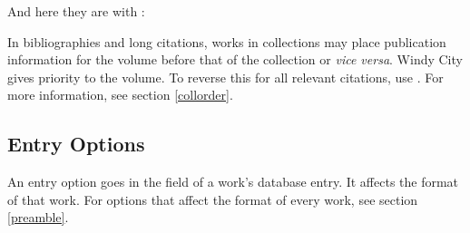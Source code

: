 \documentclass[11pt,letterpaper,oneside]{article}
\begin{document}
\begin{optionlist}
\hypersetup{citecolor=blue}
\begin{citeonly}
\item \cite[24--25]{morley1995}
\item \cite{schwartz1992}
\item \cite{kaiser1964}
\item \cite[43]{morley1995}
\item \cite[138]{schwartz1992}
\item \cite[189--90]{kaiser1964}
\end{citeonly}

\noindent And here they are with :

\begin{citeonly}
\item \cite[24--25]{morley1995}
\item \cite{schwartz1992}
\item \cite{kaiser1964}
\item \cite[43]{morley1995}
\item \cite[138]{schwartz1992}
\item \cite[189--90]{kaiser1964}
\end{citeonly}
\hypersetup{citecolor=}


\noindent In bibliographies and long citations, works in collections
may place publication information for the volume before that of the
collection or \textit{vice versa}. Windy City gives priority to the
volume. To reverse this for all relevant citations, use .
For more information, see section \ref{collorder}.

\end{optionlist}

\subsection{Entry Options}
\label{entry}

An entry option goes in the  field of a work's
database entry. It affects the format of that work. For options that
affect the format of every work, see section \ref{preamble}.
\end{document}
